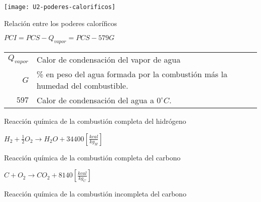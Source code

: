 \documentclass[11pt,a4paper]{article}
\newcommand{\vs}{\vspace{-.3cm}}
\begin{document}
	\begin{multicols}{2}
		\begin{cajita}
			
			
			\vspace{.2cm}
			
			\texttt{[image: U2-poderes-calorificos]}\vs
			
			\begin{flushleft}
				Relación entre los poderes caloríficos
			\end{flushleft}\vspace{-.2cm}
			
			$PCI = PCS - Q_{vapor} = PCS - 579 G$\vspace{.2cm}
			
			
			\vspace{.2cm}
			
			\begin{tabular}{r p{.7\linewidth}}
				$Q_{vapor}$ & Calor de condensación del vapor de agua\\
				$G$ & \% en peso del agua formada por la combustión más la humedad del combustible.\\
				$597$ & Calor de condensación del agua a $0^\circ C$.
			\end{tabular}
			
			\vspace{-.8cm}
			
			
			\begin{flushleft}
				Reacción química de la combustión completa del hidrógeno
			\end{flushleft}\vs
			
			$H_2 + \frac{1}{2}O_2 \rightarrow H_2O + \boxed{34400} \left[\frac{kcal}{kg_H}\right]$
		
		\vspace{-.8cm}
		
		\begin{flushleft}
			Reacción química de la combustión completa del carbono
		\end{flushleft}\vs
	
		$C + O_2 \rightarrow CO_2 + \boxed{8140} \left[\frac{kcal}{kg_C}\right]$
		
		\begin{flushleft}
			Reacción química de la combustión incompleta del carbono
		\end{flushleft}\vs
	

\end{cajita}
\end{multicols}
\end{document}
